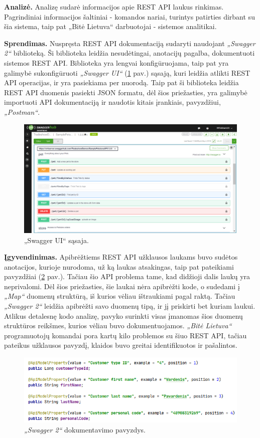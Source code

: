 \textbf{Analizė.}
Analizę sudarė informacijos apie REST API laukus rinkimas. Pagrindiniai informacijos šaltiniai - komandos nariai, turintys patirties dirbant su šia sistema,
taip pat „Bitė Lietuva“ darbuotojai - sistemos analitikai.

\textbf{Sprendimas.}
Nuspręsta REST API dokumentaciją sudaryti naudojant \textit{„Swagger 2“} biblioteką. Ši biblioteka leidžia nesudėtingai, anotacijų pagalba, dokumentuoti sistemos REST API.
Biblioteka yra lengvai konfigūruojama, taip pat yra galimybė sukonfigūruoti \textit{„Swagger UI“} (\ref{img:swagger} pav.\footnotemark[4]) sąsają,
kuri leidžia atlikti REST API operacijas, ir yra pasiekiama  per nuorodą. Taip pat ši biblioteka leidžia REST API duomenis pasiekti JSON formatu, dėl šios priežasties,
yra galimybė importuoti API dokumentaciją ir naudotis kitais įrankiais, pavyzdžiui, \textit{„Postman“}.


\begin{figure}[H]
    \centering
    \includegraphics[scale=0.25]{img/swagger.png}
    \caption{„Swagger UI“ sąsaja.}
    \label{img:swagger}
\end{figure}

\textbf{Įgyvendinimas.}
Apibrėžtiems REST API užklausos laukams buvo sudėtos anotacijos, kurioje nurodoma, už ką laukas atsakingas, taip pat pateikiami pavyzdžiai (\ref{img:customer-dto} pav.).
Tačiau šio API problema tame, kad didžioji dalis laukų yra neprivalomi. Dėl šios priežasties, šie laukai nėra apibrėžti kode, o sudedami į \textit{„Map“} duomenų struktūrą, iš kurios
vėliau ištraukiami pagal raktą. Tačiau \textit{„Swagger 2“} leidžia apibrėžti savo duomenų tipą, ir jį priskirti bet kuriam laukui. Atlikus detalesnę kodo analizę, pavyko surinkti
visas įmanomas šios duomenų struktūros reikšmes, kurios vėliau buvo dokumentuojamos.
\textit{„Bitė Lietuva“} programuotojų komandai pora kartų kilo problemos su šiuo REST API, tačiau pateikus užklausos pavyzdį, klaidos buvo greitai identifikuotos ir pašalintos.


\begin{figure}[H]
    \centering
    \includegraphics[scale=0.5]{img/customer-dto.png}
    \caption{\textit{„Swagger 2“} dokumentavimo pavyzdys.}
    \label{img:customer-dto}
\end{figure}
